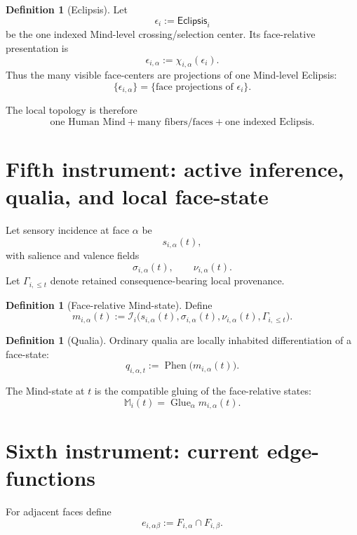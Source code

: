\documentclass[10pt]{article}
\theoremstyle{pe}
\theoremstyle{definition}
\newtheorem{definition}[theorem]{Definition}
\newcommand{\Glue}{\operatorname{Glue}}
\newcommand{\Phen}{\operatorname{Phen}}
\newcommand{\Eclipsis}{\mathsf{Eclipsis}}
\begin{document}
\begin{definition}[Eclipsis]
Let
\[
  \epsilon_i:=\Eclipsis_i
\]
be the one indexed Mind-level crossing/selection center.  Its face-relative presentation is
\[
  \epsilon_{i,\alpha}:=\chi_{i,\alpha}(\epsilon_i).
\]
Thus the many visible face-centers are projections of one Mind-level Eclipsis:
\[
  \{\epsilon_{i,\alpha}\}
  =
  \{\text{face projections of }\epsilon_i\}.
\]
\end{definition}

The local topology is therefore
\[
  \boxed{
  \text{one Human Mind}
  +
  \text{many fibers/faces}
  +
  \text{one indexed Eclipsis}.
  }
\]

\section{Fifth instrument: active inference, qualia, and local face-state}

Let sensory incidence at face \(\alpha\) be
\[
  s_{i,\alpha}(t),
\]
with salience and valence fields
\[
  \sigma_{i,\alpha}(t),
  \qquad
  \nu_{i,\alpha}(t).
\]
Let \(\Gamma_{i,\le t}\) denote retained consequence-bearing local provenance.

\begin{definition}[Face-relative Mind-state]
Define
\begin{equation}\label{eq:face-state}
  m_{i,\alpha}(t)
  :=
  \mathcal I_i
  \bigl(
    s_{i,\alpha}(t),
    \sigma_{i,\alpha}(t),
    \nu_{i,\alpha}(t),
    \Gamma_{i,\le t}
  \bigr).
\end{equation}
\end{definition}

\begin{definition}[Qualia]
Ordinary qualia are locally inhabited differentiation of a face-state:
\[
  q_{i,\alpha,t}
  :=
  \Phen\bigl(m_{i,\alpha}(t)\bigr).
\]
\end{definition}

The Mind-state at \(t\) is the compatible gluing of the face-relative states:
\[
  \boxed{
  \mathbb M_i(t)
  =
  \Glue_{\alpha}m_{i,\alpha}(t).
  }
\]

\section{Sixth instrument: current edge-functions}

For adjacent faces define
\[
  e_{i,\alpha\beta}
  :=
  F_{i,\alpha}\cap F_{i,\beta}.
\]
\end{document}
